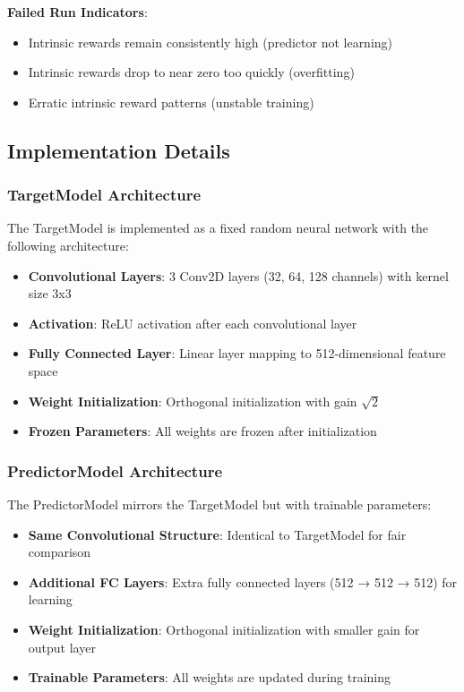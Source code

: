 \documentclass[12pt]{article}
\begin{document}
{{{\begin{itemize}[noitemsep]
\begin{enumerate}
    \textbf{Failed Run Indicators}:
    \begin{itemize}
        \item Intrinsic rewards remain consistently high (predictor not learning)
        \item Intrinsic rewards drop to near zero too quickly (overfitting)
        \item Erratic intrinsic reward patterns (unstable training)
    \end{itemize}
\end{enumerate}
\end{itemize}

\subsection{Implementation Details}

\subsubsection{TargetModel Architecture}
The TargetModel is implemented as a fixed random neural network with the following architecture:
\begin{itemize}
    \item \textbf{Convolutional Layers}: 3 Conv2D layers (32, 64, 128 channels) with kernel size 3x3
    \item \textbf{Activation}: ReLU activation after each convolutional layer
    \item \textbf{Fully Connected Layer}: Linear layer mapping to 512-dimensional feature space
    \item \textbf{Weight Initialization}: Orthogonal initialization with gain $\sqrt{2}$
    \item \textbf{Frozen Parameters}: All weights are frozen after initialization
\end{itemize}

\subsubsection{PredictorModel Architecture}
The PredictorModel mirrors the TargetModel but with trainable parameters:
\begin{itemize}
    \item \textbf{Same Convolutional Structure}: Identical to TargetModel for fair comparison
    \item \textbf{Additional FC Layers}: Extra fully connected layers (512 → 512 → 512) for learning
    \item \textbf{Weight Initialization}: Orthogonal initialization with smaller gain for output layer
    \item \textbf{Trainable Parameters}: All weights are updated during training
\end{itemize}

}}}
\end{document}

